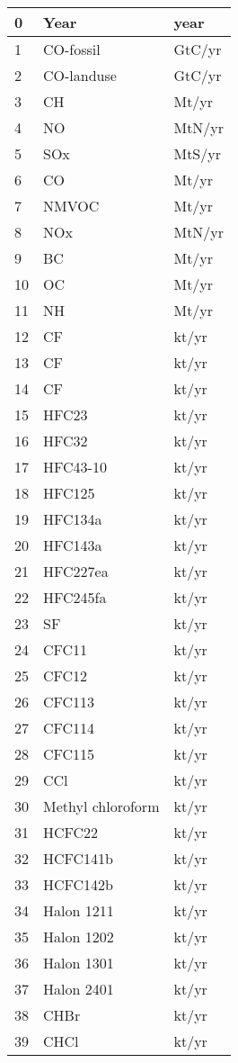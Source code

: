 \documentclass[letterpaper,10pt,english]{sphinxmanual}
\begin{document}
\begin{longtable}{|l|l|l|}
0
&
Year
&
year
\\
\hline
1
&
CO-fossil
&
GtC/yr
\\
\hline
2
&
CO-landuse
&
GtC/yr
\\
\hline
3
&
CH
&
Mt/yr
\\
\hline
4
&
NO
&
MtN/yr
\\
\hline
5
&
SOx
&
MtS/yr
\\
\hline
6
&
CO
&
Mt/yr
\\
\hline
7
&
NMVOC
&
Mt/yr
\\
\hline
8
&
NOx
&
MtN/yr
\\
\hline
9
&
BC
&
Mt/yr
\\
\hline
10
&
OC
&
Mt/yr
\\
\hline
11
&
NH
&
Mt/yr
\\
\hline
12
&
CF
&
kt/yr
\\
\hline
13
&
CF
&
kt/yr
\\
\hline
14
&
CF
&
kt/yr
\\
\hline
15
&
HFC23
&
kt/yr
\\
\hline
16
&
HFC32
&
kt/yr
\\
\hline
17
&
HFC43-10
&
kt/yr
\\
\hline
18
&
HFC125
&
kt/yr
\\
\hline
19
&
HFC134a
&
kt/yr
\\
\hline
20
&
HFC143a
&
kt/yr
\\
\hline
21
&
HFC227ea
&
kt/yr
\\
\hline
22
&
HFC245fa
&
kt/yr
\\
\hline
23
&
SF
&
kt/yr
\\
\hline
24
&
CFC11
&
kt/yr
\\
\hline
25
&
CFC12
&
kt/yr
\\
\hline
26
&
CFC113
&
kt/yr
\\
\hline
27
&
CFC114
&
kt/yr
\\
\hline
28
&
CFC115
&
kt/yr
\\
\hline
29
&
CCl
&
kt/yr
\\
\hline
30
&
Methyl chloroform
&
kt/yr
\\
\hline
31
&
HCFC22
&
kt/yr
\\
\hline
32
&
HCFC141b
&
kt/yr
\\
\hline
33
&
HCFC142b
&
kt/yr
\\
\hline
34
&
Halon 1211
&
kt/yr
\\
\hline
35
&
Halon 1202
&
kt/yr
\\
\hline
36
&
Halon 1301
&
kt/yr
\\
\hline
37
&
Halon 2401
&
kt/yr
\\
\hline
38
&
CHBr
&
kt/yr
\\
\hline
39
&
CHCl
&
kt/yr
\\
\hline\end{longtable}
\end{document}

